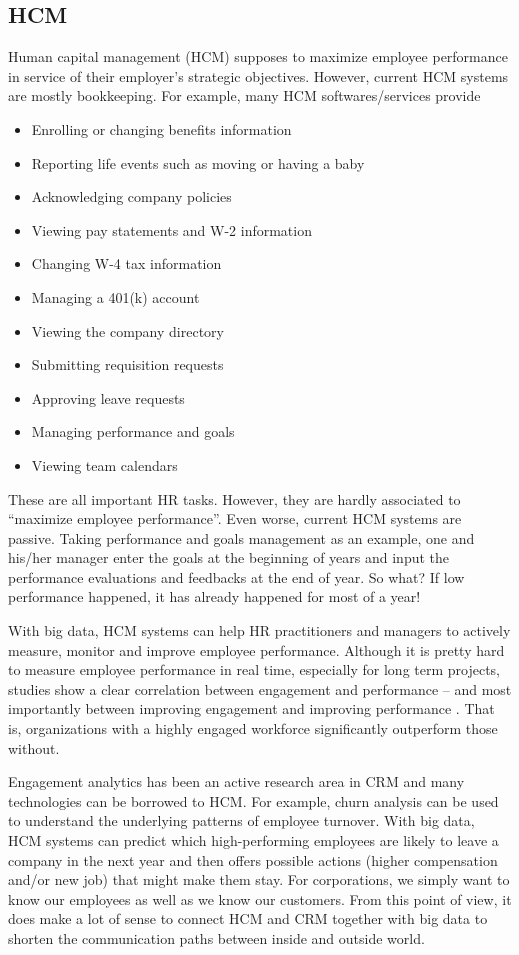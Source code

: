 \documentclass[11pt]{book}
\begin{document}
\subsection{HCM}
Human capital management (HCM) supposes to maximize employee performance in service of their employer's strategic objectives. However, current HCM systems are mostly bookkeeping. For example, many HCM softwares/services provide \cite{AdpHcm}
\begin{itemize}
\item Enrolling or changing benefits information
\item Reporting life events such as moving or having a baby
\item Acknowledging company policies
\item Viewing pay statements and W-2 information
\item Changing W-4 tax information
\item Managing a 401(k) account
\item Viewing the company directory
\item Submitting requisition requests
\item Approving leave requests
\item Managing performance and goals
\item Viewing team calendars
\end{itemize}
These are all important HR tasks. However, they are hardly associated to ``maximize employee performance''. Even worse, current HCM systems are passive. Taking performance and goals management as an example, one and his/her manager enter the goals at the beginning of years and input the performance evaluations and feedbacks at the end of year. So what? If low performance happened, it has already happened for most of a year!

With big data, HCM systems can help HR practitioners and managers to actively measure, monitor and improve employee performance. Although it is pretty hard to measure employee performance in real time, especially for long term projects, studies show a clear correlation between engagement and performance -- and most importantly between improving engagement and improving performance \cite{MacLeodClarke2012}. That is, organizations with a highly engaged workforce significantly outperform those without.

Engagement analytics has been an active research area in CRM and many technologies can be borrowed to HCM. For example, churn analysis can be used to understand the underlying patterns of employee turnover. With big data, HCM systems can predict which high-performing employees are likely to leave a company in the next year and then offers possible actions (higher compensation and/or new job) that might make them stay. For corporations, we simply want to know our employees as well as we know our customers.  From this point of view, it does make a lot of sense to connect HCM and CRM together with big data to shorten the communication paths between inside and outside world.
\end{document}
